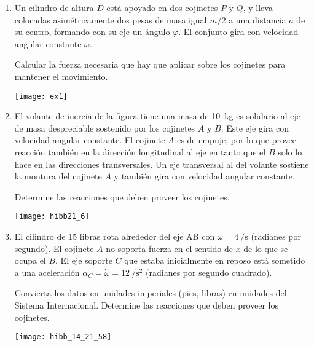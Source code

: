 \documentclass[11pt,spanish,a4paper]{article}
\begin{document}
\begin{enumerate}
\item 
\begin{minipage}[t][3.5cm]{0.6\textwidth}
Un cilindro de altura \(D\) está apoyado en dos cojinetes \(P\) y \(Q\), y lleva colocadas asimétricamente dos pesas de masa igual \(m/2\) a una distancia \(a\) de su centro, formando con su eje un ángulo \(\varphi\).
El conjunto gira con velocidad angular constante \(\omega\).
\begin{tasks} 
	\task Calcular la fuerza necesaria que hay que aplicar sobre los cojinetes para mantener el movimiento.
\end{tasks}
\end{minipage}
\begin{minipage}[c][0.5cm][t]{0.35\textwidth}
	\texttt{[image: ex1]}
\end{minipage}



\item 
\begin{minipage}[t][4.5cm]{0.65\textwidth}
El volante de inercia de la figura tiene una masa de \SI{10}{\kilo\gram} es solidario al eje de masa despreciable sostenido por los cojinetes \(A\) y \(B\).
Este eje gira con velocidad angular constante.
El cojinete \(A\) es de empuje, por lo que provee reacción también en la dirección longitudinal al eje en tanto que el \(B\) solo lo hace en las direcciones transversales.
Un eje transversal al del volante sostiene la montura del cojinete \(A\) y también gira con velocidad angular constante.
\begin{tasks} 
	\task Determine las reacciones que deben proveer los cojinetes.
\end{tasks}
\end{minipage}
\begin{minipage}[c][0.5cm][t]{0.3\textwidth}
	\texttt{[image: hibb21\_6]}
\end{minipage}



\item 
\begin{minipage}[t][3cm]{0.7\textwidth}
El cilindro de 15 libras rota alrededor del eje AB con \(\omega = \SI{4}{\per\second}\) (radianes por segundo).
El cojinete \(A\) no soporta fuerza en el sentido de \(x\) de lo que se ocupa el \(B\).
El eje soporte \(C\) que estaba inicialmente en reposo está sometido a una aceleración \(\alpha_C = \dot{\omega} = \SI{12}{\per\second\squared}\) (radianes por segundo cuadrado). 
\begin{tasks}
	\task Convierta los datos en unidades imperiales (pies, libras) en unidades del Sistema Internacional.
	\task Determine las reacciones que deben proveer los cojinetes.
\end{tasks}
\end{minipage}
\begin{minipage}[c][2cm][t]{0.25\textwidth}
	\texttt{[image: hibb\_14\_21\_58]}
\end{minipage}




\end{enumerate}
\end{document}
